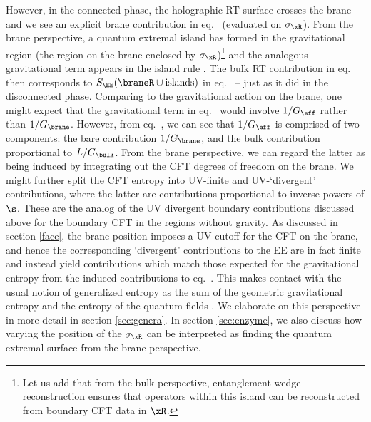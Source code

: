 However, in the connected phase, the holographic RT surface crosses the brane and we see an explicit brane contribution in eq.~ (evaluated on $\sigma_\xR$). From the brane perspective, a quantum extremal island has formed in the gravitational region (\ie the region on the brane enclosed by $\sigma_\xR$)\footnote{Let us add that from the bulk perspective, entanglement wedge reconstruction \cite{EW1,EW2,EW3,Jafferis:2015del,Dong:2016eik,Faulkner:2017vdd,Cotler:2017erl} ensures that operators within this island can be reconstructed from boundary CFT data in $\xR$.} and the analogous gravitational term appears in the island rule . The bulk RT contribution in eq.~ then corresponds to $S_\EE(\braneR \cup \text{islands})$ in eq.~ -- just as it did in the disconnected phase. Comparing to the gravitational action  on the brane, one might expect that the gravitational term in eq.~ would involve $1/G_\eff$ rather than $1/G_\brane$. However, from eq.~,  we can see that $1/G_\eff$ is comprised of two components: the bare contribution $1/G_\brane$, and the bulk contribution proportional to $L/G_\bulk$. From the brane perspective, we can regard the latter as being induced by integrating out the CFT degrees of freedom on the brane. We might further split the CFT entropy into UV-finite and UV-`divergent' contributions, where the latter are contributions proportional to inverse powers of $\s$. These are the analog of the UV divergent boundary contributions discussed above for the boundary CFT in the regions without gravity. As discussed in section \ref{face}, the brane position imposes  a UV cutoff for the CFT on the brane, and hence the corresponding `divergent' contributions to the EE are in fact finite and instead yield contributions which match those expected for the gravitational entropy from the induced contributions to eq.~. This makes contact with the usual notion of generalized entropy as the sum of the geometric gravitational entropy and the entropy of the quantum fields \cite{Faulkner:2013ana,Engelhardt:2014gca}. We elaborate on this perspective in more detail in section \ref{sec:genera}. In section \ref{sec:enzyme}, we also discuss how varying the position of the $\sigma_\xR$ can be interpreted as finding the quantum extremal surface from the brane perspective.




